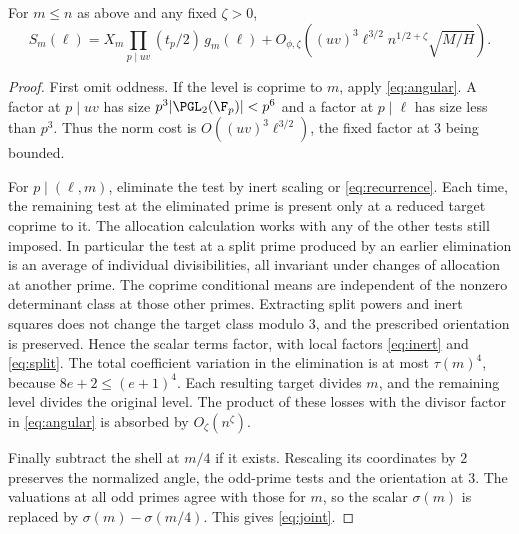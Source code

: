 \begin{lemma}\label{lem:joint}
For \(m\le n\) as above and any fixed \(\zeta>0\),
\begin{equation}\label{eq:joint}
 S_m(\ell)=X_m\prod_{p\mid uv}(t_p/2)\,g_m(\ell)
   +O_{\phi,\zeta}\!\left((uv)^3\ell^{3/2}n^{1/2+\zeta}
                                           \sqrt{M/H}\right).
\end{equation}
\end{lemma}
\begin{proof}
First omit oddness. If the level is coprime to \(m\), apply
\eqref{eq:angular}. A factor at \(p\mid uv\) has size
\(p^3|\PGL_2(\F_p)|<p^6\) and a factor at \(p\mid\ell\)
has size less than \(p^3\). Thus the norm cost is
\(O((uv)^3\ell^{3/2})\), the fixed factor at \(3\) being bounded.

For \(p\mid(\ell,m)\), eliminate the test by inert scaling or
\eqref{eq:recurrence}. Each time, the remaining test at the
eliminated prime is present only at a reduced target coprime to it.
The allocation calculation works with any of the other tests
still imposed. In particular the test at a split prime produced
by an earlier elimination is an average of individual
divisibilities, all invariant under changes of allocation at
another prime. The coprime conditional means are independent of
the nonzero determinant class at those other primes. Extracting
split powers and inert squares does not change the target class
modulo \(3\), and the prescribed orientation is preserved. Hence
the scalar terms factor, with local factors
\eqref{eq:inert} and \eqref{eq:split}. The total coefficient variation
in the elimination is at most \(\tau(m)^4\), because
\(8e+2\le(e+1)^4\). Each resulting target divides \(m\), and the
remaining level divides the original level. The product of these
losses with the divisor factor in \eqref{eq:angular} is absorbed
by \(O_\zeta(n^\zeta)\).

Finally subtract the shell at \(m/4\) if it exists. Rescaling its
coordinates by \(2\) preserves the normalized angle, the odd-prime
tests and the orientation at \(3\). The valuations at all odd
primes agree with those for \(m\), so the scalar \(\sigma(m)\)
is replaced by \(\sigma(m)-\sigma(m/4)\). This gives
\eqref{eq:joint}.
\end{proof}
